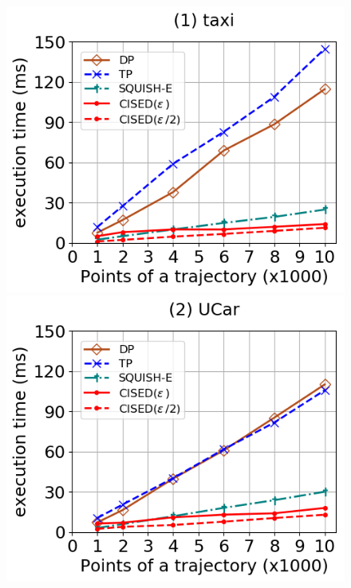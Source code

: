 \begin{figure}[tb!]
	\centering
	\includegraphics[scale=0.315]{Figures/Exp-SED-time-size-taxi.png}\hspace{1ex}
	\includegraphics[scale=0.315]{Figures/Exp-SED-time-size-service.png}	\hspace{1ex}

\end{figure}
